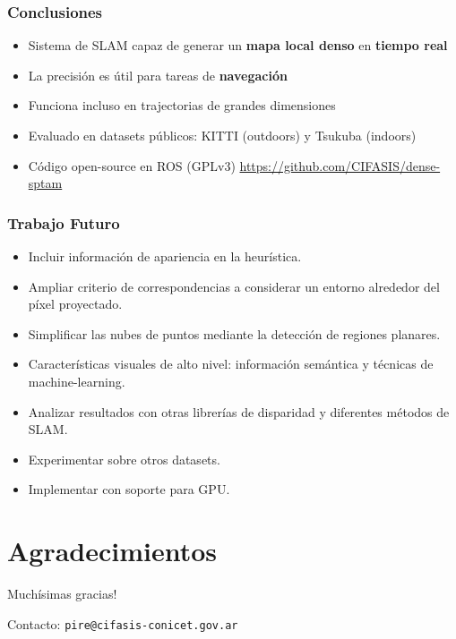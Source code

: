\documentclass[compress]{beamer}
\begin{document}
\begin{frame}
	\frametitle{Conclusiones}
	\begin{itemize}
		\item Sistema de SLAM capaz de generar un \textbf{mapa local denso} en \textbf{tiempo real}
        \item La precisión es útil para tareas de \textbf{navegación}
        \item Funciona incluso en trajectorias de grandes dimensiones
        \item Evaluado en datasets públicos: KITTI (outdoors) y Tsukuba (indoors)
	    \item Código open-source en ROS (GPLv3)
	    \url{https://github.com/CIFASIS/dense-sptam}
	\end{itemize}
\end{frame}


\begin{frame}
	\frametitle{Trabajo Futuro}
	\begin{itemize}
		\item Incluir información de apariencia en la heurística.
		\item Ampliar criterio de correspondencias a considerar un entorno alrededor del píxel proyectado.
		\item Simplificar las nubes de puntos mediante la detección de regiones planares.
		\item Características visuales de alto nivel: información semántica y técnicas de machine-learning.
		\item Analizar resultados con otras librerías de disparidad y diferentes métodos de SLAM.
		\item Experimentar sobre otros datasets.
		\item Implementar con soporte para GPU.
	\end{itemize}
\end{frame}


\section*{Agradecimientos}

\begin{frame}
	\centering
	\Large{Muchísimas gracias!}
	
	
	\vspace{2cm}
	Contacto: {\tt pire@cifasis-conicet.gov.ar}
\end{frame}
\end{document}
